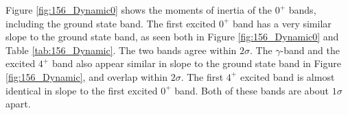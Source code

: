 





Figure \ref{fig:156_Dynamic0} shows the moments of inertia of the $0^+$ bands, including the ground state band. The first excited $0^+$ band has a very similar slope to the ground state band, as seen both in Figure \ref{fig:156_Dynamic0} and Table \ref{tab:156_Dynamic}. The two bands agree within $2\sigma$. The $\gamma$-band and the excited $4^+$ band also appear similar in slope to the ground state band in Figure \ref{fig:156_Dynamic}, and overlap within $2\sigma$. The first $4^+$ excited band is almost identical in slope to the first excited $0^+$ band. Both of these bands are about $1\sigma$ apart.